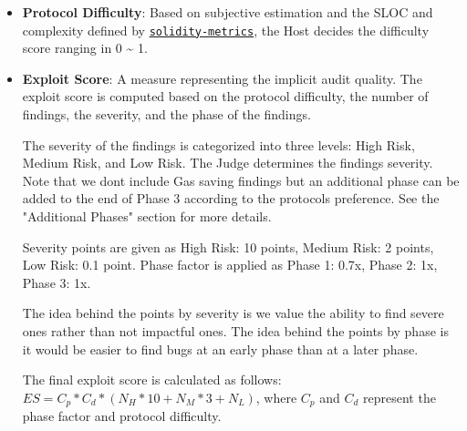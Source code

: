 \documentclass[10pt]{extarticle}
\begin{document}
\begin{itemize}
\item
  \textbf{Protocol Difficulty}: Based on subjective estimation and the
  SLOC and complexity defined by
  \href{https://marketplace.visualstudio.com/items?itemName=tintinweb.solidity-metrics}{\texttt{solidity-metrics}},
  the Host decides the difficulty score ranging in 0 \textasciitilde{}
  1.
\item
  \textbf{Exploit Score}: A measure representing the implicit audit
  quality. The exploit score is computed based on the protocol
  difficulty, the number of findings, the severity, and the phase of the
  findings.

  The severity of the findings is categorized into three levels: High
  Risk, Medium Risk, and Low Risk. The Judge determines the
  findings\textquotesingle{} severity. Note that we
  don\textquotesingle t include Gas saving findings but an additional
  phase can be added to the end of Phase 3 according to the
  protocol\textquotesingle s preference. See the "Additional Phases"
  section for more details.

  Severity points are given as High Risk: 10 points, Medium Risk: 2
  points, Low Risk: 0.1 point. Phase factor is applied as Phase 1: 0.7x,
  Phase 2: 1x, Phase 3: 1x.

  The idea behind the points by severity is we value the ability to find
  severe ones rather than not impactful ones. The idea behind the points
  by phase is it would be easier to find bugs at an early phase than at
  a later phase.

  The final exploit score is calculated as follows:
  \(ES=C_p*C_d*(N_H*10+N_M*3+N_L)\), where \(C_p\) and \(C_d\) represent
  the phase factor and protocol difficulty.


\end{itemize}
\end{document}
